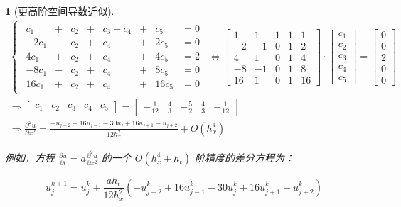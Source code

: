 \documentclass[zihao=5,UTF8]{report}
\theoremstyle{MyTheoremStyle} %
\theoremstyle{MySubsubsectionStyle} %
\newtheorem{definition}{}
\begin{document}
\begin{definition}[更高阶空间导数近似]
\begin{gather}
    \begin{cases}
    \begin{aligned}
        c_1&+&c_2&+&c_3+c_4&+&c_5&=0\\
        -2c_1&-&c_2&+&c_4&+&2c_5&=0\\
        4c_1&+&c_2&+&c_4&+&4c_5&=2\\
        -8c_1&-&c_2&+&c_4&+&8c_5&=0\\
        16c_1&+&c_2&+&c_4&+&16c_5&=0
    \end{aligned}
    \end{cases} \Longleftrightarrow 
    \begin{bmatrix}
        1&  1& 1& 1& 1 \\
       -2& -1& 0& 1& 2 \\ 
        4&  1& 0& 1& 4 \\ 
       -8& -1& 0& 1& 8 \\ 
       16&  1& 0& 1& 16
    \end{bmatrix} \cdot 
    \begin{bmatrix}
        c_1 \\ c_2 \\ c_3 \\ c_4 \\ c_5
    \end{bmatrix} = 
    \begin{bmatrix}
        0 \\ 0 \\ 2 \\ 0 \\ 0
    \end{bmatrix} \\ 
    \Longrightarrow 
    \begin{bmatrix}
        c_1 & c_2 & c_3 & c_4 & c_5
    \end{bmatrix} = 
    \begin{bmatrix}
        -\frac{1}{12} & \frac{4}{3} & -\frac{5}{2} & \frac{4}{3} & - \frac{1}{12}
    \end{bmatrix} \\ 
    \Longrightarrow 
    \frac{\partial^2u}{\partial x^2}=\frac{-u_{j-2}+16u_{j-1}-30u_j+16u_{j+1}-u_{j+2}}{12h_x^2}+O(h_x^4)
\end{gather}

{\par\color{gray}\small
例如，方程 $\frac{\partial u}{\partial t}=a\frac{\partial^2u}{\partial x^2}$ 的一个 $O(h_x^4 + h_t)$ 阶精度的差分方程为：

\begin{equation}
    u_j^{k+1}=u_j^k+\frac{ah_t}{12h_x^2}(-u_{j-2}^k+16u_{j-1}^k-30u_j^k+16u_{j+1}^k-u_{j+2}^k)
\end{equation}

\par}
\end{definition}
\end{document}
